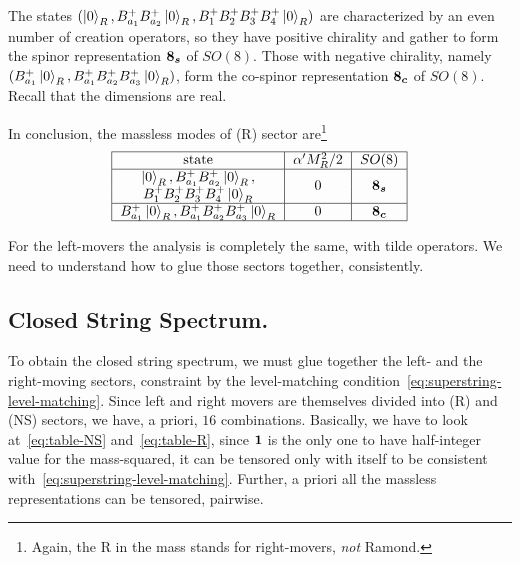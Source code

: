 The states $(\ket{0}_{R}, B^+_{a_1}B^+_{a_2}\ket{0}_{R},B^+_{1}B^+_{2}B^+_{3}B^+_{4} \ket{0}_{R})$ are characterized by an even number of creation operators, so they have positive chirality and gather to form the spinor representation $\boldsymbol{8_s}$ of $SO(8)$. Those with negative chirality, namely $(B^+_{a_1} \ket{0}_{R}, B^+_{a_1}B^+_{a_2}B^+_{a_3}\ket{0}_{R})$, form the co-spinor representation $\boldsymbol{8_c}$ of $SO(8)$. Recall that the dimensions are real.

In conclusion, the massless modes of (R) sector are\footnote{Again, the R in the mass stands for right-movers, \emph{not} Ramond.}
\begin{equation}\label{eq:table-R}
    \begin{tabular}{|c|c|c|}
        \hline    state & $\alpha' M^2_R / 2$ & $SO(8)$ \\ \hline
        \multirow{2}{*}{$\begin{array}{c} 
            \ket{0}_{R}, B^+_{a_1}B^+_{a_2}\ket{0}_{R}, \\ 
            B^+_{1}B^+_{2}B^+_{3}B^+_{4} \ket{0}_{R} 
        \end{array}$} & \multirow{2}{*}{$0$} & \multirow{2}{*}{$\s$} \\ 
        & & \\ \hline
        $B^+_{a_1} \ket{0}_{R}, B^+_{a_1}B^+_{a_2}B^+_{a_3}\ket{0}_{R}$   & $0$   & $\c$\\ \hline
    \end{tabular}
\end{equation}

For the left-movers the analysis is completely the same, with tilde operators. We need to understand how to glue those sectors together, consistently.

\subsection{Closed String Spectrum.}
To obtain the closed string spectrum, we must glue together the left- and the right-moving sectors, constraint by the level-matching condition~\eqref{eq:superstring-level-matching}. Since left and right movers are themselves divided into (R) and (NS) sectors, we have, a priori, $16$ combinations. Basically, we have to look at~\eqref{eq:table-NS} and~\eqref{eq:table-R}, since $\boldsymbol{1}$ is the only one to have half-integer value for the mass-squared, it can be tensored only with itself to be consistent with~\eqref{eq:superstring-level-matching}. Further, a priori all the massless representations can be tensored, pairwise.

